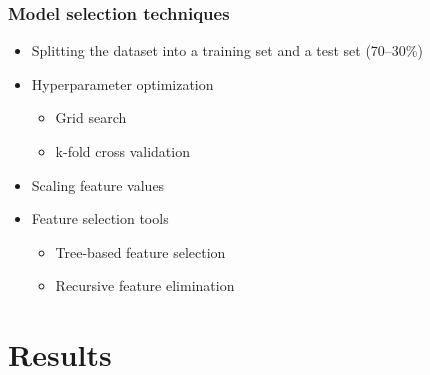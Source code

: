 \documentclass[slidestop,compress,11pt,xcolor=dvipsnames]{beamer}
\begin{document}

\begin{frame}
\centering
\frametitle{Model selection techniques}
\begin{itemize}
	\item Splitting the dataset into a training set and a test set (70–30\%)
 	\item Hyperparameter optimization
 	\begin{itemize}
 		\item Grid search
 		\item k-fold cross validation
 	\end{itemize}
 	\item Scaling feature values
 	\item Feature selection tools
 	\begin{itemize} 	
 		\item Tree-based feature selection
 		\item Recursive feature elimination
 	\end{itemize} 
\end{itemize}

\end{frame}
\section{Results}
\end{document}
